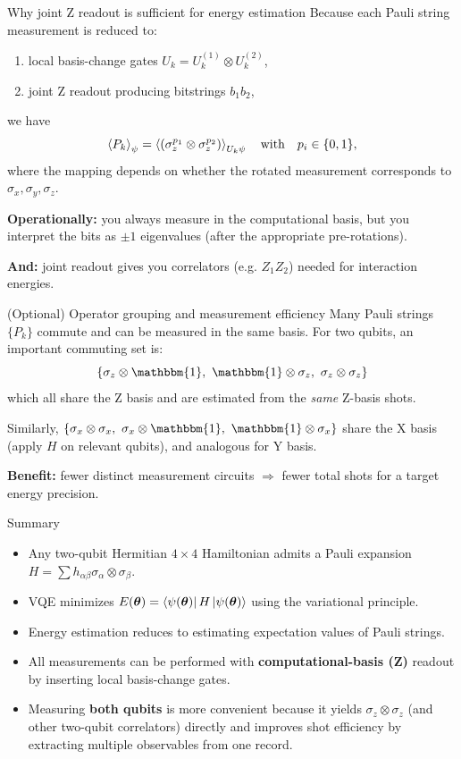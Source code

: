 \documentclass[aspectratio=169]{beamer}
\newcommand{\Z}{\sigma_z}
\newcommand{\X}{\sigma_x}
\newcommand{\Y}{\sigma_y}
\newcommand{\I}{\mathbbm{1}}
\begin{document}
\begin{frame}{Why joint Z readout is sufficient for energy estimation}
Because each Pauli string measurement is reduced to:
\begin{enumerate}
  \item local basis-change gates \(U_k = U_k^{(1)}\otimes U_k^{(2)}\),
  \item joint Z readout producing bitstrings \(b_1 b_2\),
\end{enumerate}
we have
\[
\expval{P_k}_{\psi}
=
\expval{(\Z^{p_1}\otimes \Z^{p_2})}_{U_k\psi}
\quad\text{with}\quad p_i\in\{0,1\},
\]
where the mapping depends on whether the rotated measurement corresponds to \(\X,\Y,\Z\).

\textbf{Operationally:} you always measure in the computational basis, but you interpret the bits as \(\pm 1\) eigenvalues (after the appropriate pre-rotations).

\textbf{And:} joint readout gives you correlators (e.g. \(Z_1 Z_2\)) needed for interaction energies.
\end{frame}


\begin{frame}{(Optional) Operator grouping and measurement efficiency}
Many Pauli strings \(\{P_k\}\) commute and can be measured in the same basis.
For two qubits, an important commuting set is:
\[
\{\Z\otimes\I,\ \I\otimes\Z,\ \Z\otimes\Z\}
\]
which all share the Z basis and are estimated from the \emph{same} Z-basis shots.

\medskip
Similarly, \(\{\X\otimes\X,\ \X\otimes\I,\ \I\otimes\X\}\) share the X basis (apply \(H\) on relevant qubits),
and analogous for Y basis.

\medskip
\textbf{Benefit:} fewer distinct measurement circuits \(\Rightarrow\) fewer total shots for a target energy precision.
\end{frame}

\begin{frame}{Summary}
\begin{itemize}
  \item Any two-qubit Hermitian \(4\times 4\) Hamiltonian admits a Pauli expansion \(H=\sum h_{\alpha\beta}\sigma_\alpha\otimes\sigma_\beta\).
  \item VQE minimizes \(E(\bm{\theta})=\bra{\psi(\bm{\theta})}H\ket{\psi(\bm{\theta})}\) using the variational principle.
  \item Energy estimation reduces to estimating expectation values of Pauli strings.
  \item All measurements can be performed with \textbf{computational-basis (Z)} readout by inserting local basis-change gates.
  \item Measuring \textbf{both qubits} is more convenient because it yields \(\Z\otimes\Z\) (and other two-qubit correlators) directly and improves shot efficiency by extracting multiple observables from one record.
\end{itemize}
\end{frame}
\end{document}
